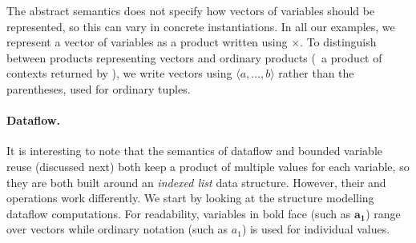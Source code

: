 The abstract semantics does not specify how vectors of variables should be represented, so this can
vary in concrete instantiations. In all our examples, we represent a vector of variables as a
product written using $\times$. To distinguish between products representing vectors and ordinary
products (\eg~a product of contexts returned by ), we write vectors using
$\langle a, \ldots, b \rangle$ rather than the parentheses, used for ordinary tuples.

\paragraph{Dataflow.}
It is interesting to note that the semantics of dataflow and bounded variable reuse (discussed
next) both keep a product of multiple values for each variable, so they are both built around an
\emph{indexed list} data structure. However, their  and  operations work
differently. We start by looking at the structure modelling dataflow computations. For readability,
variables in bold face (such as $\mathbf{a_1}$) range over vectors while ordinary notation (such
as $a_1$) is used for individual values.

